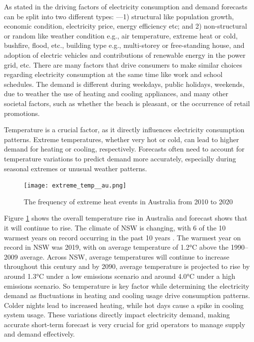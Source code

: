 \documentclass[mstat,12pt]{unswthesis}
\begin{document}
As stated in \cite{nsw_epa_2021_energy_consumption} the driving factors
of electricity consumption and demand forecasts can be split into two
different types: ---1) structural like population growth, economic
condition, electricity price, energy efficiency etc; and 2)
non-structural or random like weather condition e.g., air temperature,
extreme heat or cold, bushfire, flood, etc., building type e.g.,
multi-storey or free-standing house, and adoption of electric vehicles
and contributions of renewable energy in the power grid, etc. There are
many factors that drive consumers to make similar choices regarding
electricity consumption at the same time like work and school schedules.
The demand is different during weekdays, public holidays, weekends, due
to weather the use of heating and cooling appliances, and many other
societal factors, such as whether the beach is pleasant, or the
occurrence of retail promotions.

Temperature is a crucial factor, as it directly influences electricity
consumption patterns. Extreme temperatures, whether very hot or cold,
can lead to higher demand for heating or cooling, respectively.
Forecasts often need to account for temperature variations to predict
demand more accurately, especially during seasonal extremes or unusual
weather patterns.

\begin{figure}[H]
\centering
\texttt{[image: extreme\_temp\_\_au.png]}
\caption{The frequency of extreme heat events in Australia from 2010 to 2020}\label{extreme}
\end{figure}

Figure \ref{extreme} shows the overall temperature rise in Australia and
forecast shows that it will continue to rise. The climate of NSW is
changing, with 6 of the 10 warmest years on record occurring in the past
10 years \cite{nswAdaptNSW}. The warmest year on record in NSW was 2019,
with on average temperature of 1.2°C above the 1990--2009 average.
Across NSW, average temperatures will continue to increase throughout
this century and by 2090, average temperature is projected to rise by
around 1.3°C under a low emissions scenario and around 4.0°C under a
high emissions scenario. So temperature is key factor while determining
the electricity demand as fluctuations in heating and cooling usage
drive consumption patterns. Colder nights lead to increased heating,
while hot days cause a spike in cooling system usage. These variations
directly impact electricity demand, making accurate short-term forecast
is very crucial for grid operators to manage supply and demand
effectively.
\end{document}
